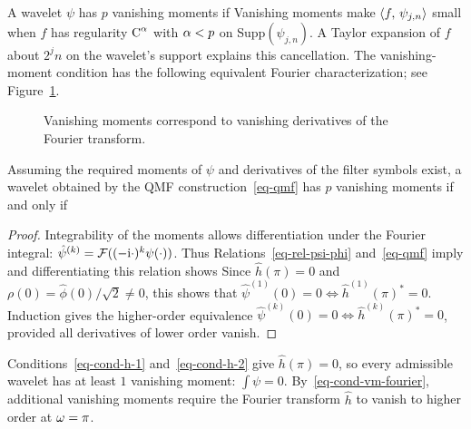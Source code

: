 A wavelet $\psi$ has $p$ vanishing moments if
Vanishing moments make $\langle f,\,\psi_{j,n}\rangle$ small when $f$ has regularity $\text{C}^\alpha$ with $\alpha<p$ on Supp$(\psi_{j,n})$. A Taylor expansion of $f$ about $2^j n$ on the wavelet's support explains this cancellation.
%
The vanishing-moment condition has the following equivalent Fourier characterization; see Figure~\ref{fig-vanmoments}.

\begin{figure}[tbp]
\centering
{}
\caption{Vanishing moments correspond to vanishing derivatives of the Fourier transform.}
\label{fig-vanmoments}
\end{figure}

\begin{prop}
Assuming the required moments of $\psi$ and derivatives of the filter symbols exist, a wavelet obtained by the QMF construction~\eqref{eq-qmf} has $p$ vanishing moments if and only if
\end{prop}
\begin{proof}
	Integrability of the moments allows differentiation under the Fourier integral: $\hat\psi^{(k)} = \mathcal{F}( (-\mathrm{i} \cdot)^k \psi(\cdot) )$. Thus
	Relations~\eqref{eq-rel-psi-phi} and~\eqref{eq-qmf} imply
	and differentiating this relation shows	
	Since $\hat h(\pi)=0$ and $\rho(0)=\hat\phi(0)/\sqrt2\neq0$, this shows that $\hat\psi^{(1)}(0)=0 \Leftrightarrow \hat h^{(1)}(\pi)^*=0$.
	Induction gives the higher-order equivalence
	$\hat\psi^{(k)}(0)=0 \Leftrightarrow \hat h^{(k)}(\pi)^*=0$, provided all derivatives of lower order vanish.
\end{proof}

Conditions~\eqref{eq-cond-h-1} and~\eqref{eq-cond-h-2} give $\hat h(\pi)=0$, so every admissible wavelet has at least $1$ vanishing moment: $\int \psi=0$. By~\eqref{eq-cond-vm-fourier}, additional vanishing moments require the Fourier transform $\hat h$ to vanish to higher order at $\omega=\pi$.

